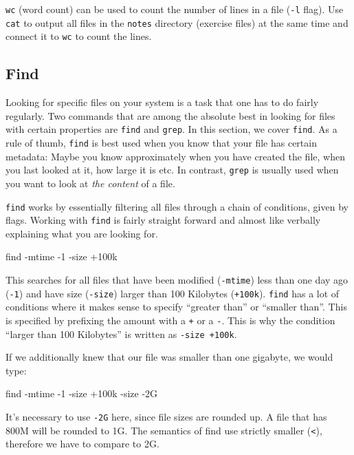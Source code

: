 \documentclass{TheAlternativeCourse}
\begin{document}
\begin{exercisebox}
    \texttt{wc} (word count) can be used to count the number of lines in a file
    (\texttt{-l} flag). Use \texttt{cat} to output all files in the
    \texttt{notes} directory (exercise files) at the same time and connect it
    to \texttt{wc} to count the lines.
\end{exercisebox}

\subsection{Find}

Looking for specific files on your system is a task that one has to do fairly
regularly. Two commands that are among the absolute best in looking for files
with certain properties are \texttt{find} and \texttt{grep}. In this section,
we cover \texttt{find}.  As a rule of thumb, \texttt{find} is best used when
you know that your file has certain metadata: Maybe you know approximately when
you have created the file, when you last looked at it, how large it is etc. In
contrast, \texttt{grep} is usually used when you want to look at \emph{the
content} of a file.

\texttt{find} works by essentially filtering all files through a chain of
conditions, given by flags. Working with \texttt{find} is
fairly straight forward and almost like verbally explaining what you are
looking for.

\begin{cmdbox}
find -mtime -1 -size +100k
\end{cmdbox}

This searches for all files that have been modified (\texttt{-mtime}) less than
one day ago (\texttt{-1}) and have size (\texttt{-size}) larger than 100
Kilobytes (\texttt{+100k}). \texttt{find} has a lot of conditions where it
makes sense to specify ``greater than'' or ``smaller than''. This is specified
by prefixing the amount with a \texttt{+} or a \texttt{-}. This is why the
condition ``larger than 100 Kilobytes'' is written as \texttt{-size +100k}.

If we additionally knew that our file was smaller than one gigabyte, we would
type:
\begin{cmdbox}
find -mtime -1 -size +100k -size -2G
\end{cmdbox}

It's necessary to use \texttt{-2G} here, since file sizes are rounded up.
A file that has 800M will be rounded to 1G. The semantics of find use strictly
smaller (\texttt{<}), therefore we have to compare to 2G.
\end{document}
